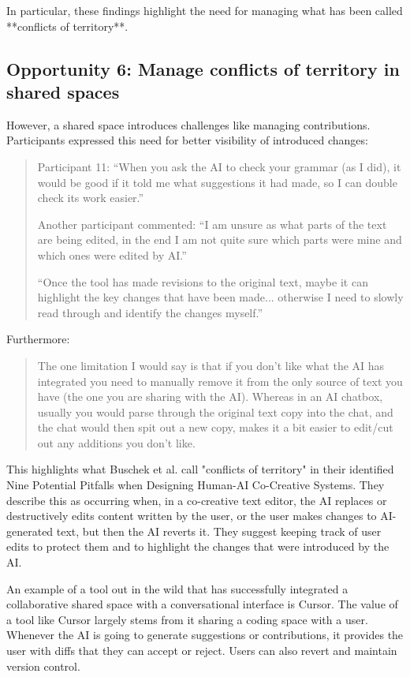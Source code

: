 In particular, these findings highlight the need for managing what has been called **conflicts of territory**.


\subsection{Opportunity 6: Manage conflicts of territory in shared spaces}

However, a shared space introduces challenges like managing contributions. Participants expressed this need for better visibility of introduced changes:
\begin{quote}
Participant 11: “When you ask the AI to check your grammar (as I did), it would be good if it told me what suggestions it had made, so I can double check its work easier.”

Another participant commented: “I am unsure as what parts of the text are being edited, in the end I am not quite sure which parts were mine and which ones were edited by AI.”

“Once the tool has made revisions to the original text, maybe it can highlight the key changes that have been made... otherwise I need to slowly read through and identify the changes myself.”
\end{quote}
Furthermore:
\begin{quote}
    The one limitation I would say is that if you don't like what the AI has integrated you need to manually remove it from the only source of text you have (the one you are sharing with the AI). Whereas in an AI chatbox, usually you would parse through the original text copy into the chat, and the chat would then spit out a new copy, makes it a bit easier to edit/cut out any additions you don't like.
\end{quote}
This highlights what Buschek et al. \cite{Buschek2021-ks} call "conflicts of territory" in their identified Nine Potential Pitfalls when Designing Human-AI Co-Creative Systems. They describe this as occurring when, in a co-creative text editor, the AI replaces or destructively edits content written by the user, or the user makes changes to AI-generated text, but then the AI reverts it. They suggest keeping track of user edits to protect them and to highlight the changes that were introduced by the AI.

An example of a tool out in the wild that has successfully integrated a collaborative shared space with a conversational interface is Cursor. The value of a tool like Cursor largely stems from it sharing a coding space with a user. Whenever the AI is going to generate suggestions or contributions, it provides the user with diffs that they can accept or reject. Users can also revert and maintain version control.

